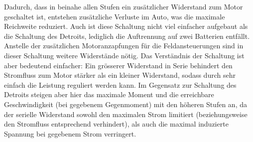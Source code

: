 Dadurch, dass in beinahe allen Stufen ein zusätzlicher Widerstand zum Motor geschaltet ist, entstehen zusätzliche Verluste im Auto, was die maximale Reichweite reduziert. Auch ist diese Schaltung nicht viel einfacher aufgebaut als die Schaltung des Detroits, lediglich die Auftrennung auf zwei Batterien entfällt. Anstelle der zusätzlichen Motoranzapfungen für die Feldansteuerungen sind in dieser Schaltung weitere Widerstände nötig. Das Verständnis der Schaltung ist aber bedeutend einfacher: Ein grösserer Widerstand in Serie behindert den Stromfluss zum Motor stärker als ein kleiner Widerstand, sodass durch sehr einfach die Leistung reguliert werden kann. Im Gegensatz zur Schaltung des Detroits steigen aber hier das maximale Moment und die erreichbare Geschwindigkeit (bei gegebenem Gegenmoment) mit den höheren Stufen an, da der serielle Widerstand sowohl den maximalen Strom limitiert (beziehungsweise den Stromfluss entsprechend verhindert), als auch die maximal induzierte Spannung bei gegebenem Strom verringert.